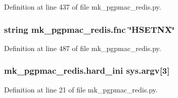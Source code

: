 Definition at line 437 of file mk\-\_\-pgpmac\-\_\-redis.\-py.

\hypertarget{namespacemk__pgpmac__redis_a654b54ba0758b8b84516938260851129}{
\subsubsection[{fnc}]{\setlength{\rightskip}{0pt plus 5cm}string mk\-\_\-pgpmac\-\_\-redis.\-fnc \char`\"{}H\-S\-E\-T\-N\-X\char`\"{}}}\label{namespacemk__pgpmac__redis_a654b54ba0758b8b84516938260851129}


Definition at line 487 of file mk\-\_\-pgpmac\-\_\-redis.\-py.

\hypertarget{namespacemk__pgpmac__redis_a5864d9c27cbe61534756880cbfebe4f1}{
\subsubsection[{hard\-\_\-ini}]{\setlength{\rightskip}{0pt plus 5cm}mk\-\_\-pgpmac\-\_\-redis.\-hard\-\_\-ini sys.\-argv\mbox{[}3\mbox{]}}}\label{namespacemk__pgpmac__redis_a5864d9c27cbe61534756880cbfebe4f1}


Definition at line 21 of file mk\-\_\-pgpmac\-\_\-redis.\-py.

